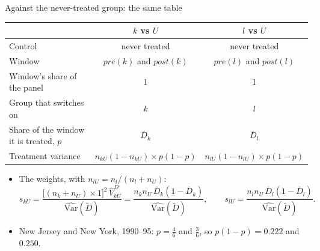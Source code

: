 \documentclass[
  11pt,
  ignorenonframetext,
  aspectratio=169,
]{beamer}
\providecommand{\tightlist}{%
  \setlength{\itemsep}{0pt}\setlength{\parskip}{0pt}}
\begin{document}
\begin{frame}{Against the never-treated group: the same table}
\protect{}\label{against-the-never-treated-group-the-same-table}
\begin{center}\small
\begin{tabular}{lcc}
\toprule
 & $k$ vs $U$ & $l$ vs $U$ \\
\midrule
Control & never treated & never treated \\
Window & $pre(k)$ and $post(k)$ & $pre(l)$ and $post(l)$ \\
Window's share of the panel & $1$ & $1$ \\
Group that switches on & $k$ & $l$ \\
Share of the window it is treated, $p$ & $\bar D_k$ & $\bar D_l$ \\[2pt]
Treatment variance & $n_{kU}(1 - n_{kU}) \times p(1-p)$ & $n_{lU}(1 - n_{lU}) \times p(1-p)$ \\
\bottomrule
\end{tabular}
\end{center}

\begin{itemize}
\tightlist
\item
  The weights, with \(n_{lU} = n_l/(n_l + n_U)\): \[
  s_{kU} = \frac{\big[(n_k + n_U) \times 1\big]^2\, \hat V^{D}_{kU}}{\widehat{\text{Var}}(\tilde D)} = \frac{n_k n_U\, \bar D_k(1 - \bar D_k)}{\widehat{\text{Var}}(\tilde D)}, \qquad s_{lU} = \frac{n_l n_U\, \bar D_l(1 - \bar D_l)}{\widehat{\text{Var}}(\tilde D)} .
  \]
\item
  New Jersey and New York, 1990--95: \(p = \tfrac46\) and \(\tfrac36\),
  so \(p(1-p) = 0.222\) and \(0.250\).
\end{itemize}
\end{frame}
\end{document}
